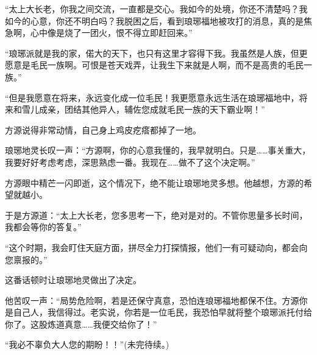 \begin{this_body}
“太上大长老，你我之间交流，一直都是交心。我如今的处境，你还不清楚吗？我如今的心意，你还不明白吗？我脱困之后，看到琅琊福地被攻打的消息，真的是焦急啊，心中像是烧了一团火，恨不得立即赶回来。”

“琅琊派就是我的家，偌大的天下，也只有这里才容得下我。我虽然是人族，但更愿意是毛民一族啊。可恨是苍天戏弄，让我生下来就是人啊，而不是高贵的毛民一族。”

“但是我愿意在将来，永远变化成一位毛民！我更愿意永远生活在琅琊福地中，将来和雪儿成亲，团结其他异人，辅佐您成就毛民一族的天下霸业啊！”

方源说得非常动情，自己身上鸡皮疙瘩都掉了一地。

琅琊地灵长叹一声：“方源啊，你的心意我懂的，我早就明白。只是……事关重大，我要好好考虑考虑，深思熟虑一番。我现在……做不了这个决定啊。”

方源眼中精芒一闪即逝，这个情况下，绝不能让琅琊地灵多想。他越想，方源的希望就越小。

于是方源道：“太上大长老，您多思考一下，绝对是对的。不管你思量多长时间，我都会等你的答复。”

“这个时期，我会盯住天庭方面，拼尽全力打探情报，他们一有可疑动向，都会向您禀报的。”

这番话顿时让琅琊地灵做出了决定。

他苦叹一声：“局势危险啊，若是还保守真意，恐怕连琅琊福地都保不住。方源你是自己人，我信得过。老实说，你若是一位毛民，我恐怕早就将整个琅琊派托付给你了。这股炼道真意……我便交给你了！”

“我必不辜负大人您的期盼！！”(未完待续。)

\end{this_body}

